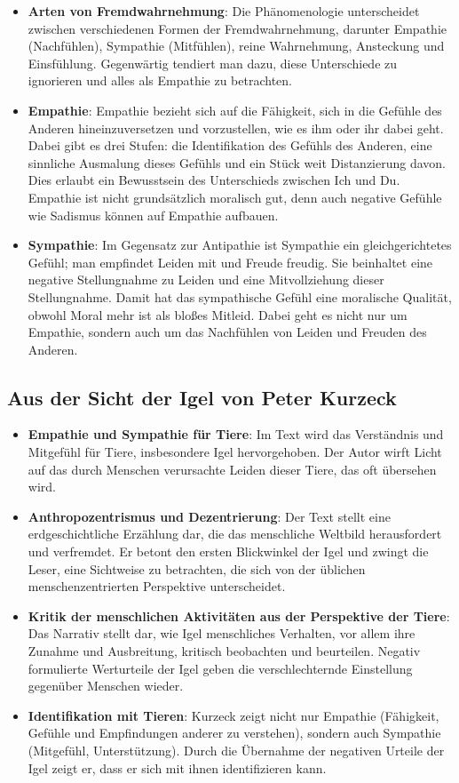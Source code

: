 \documentclass{article}
\begin{document}
\begin{itemize}
	\item \textbf{Arten von Fremdwahrnehmung}: Die Phänomenologie unterscheidet zwischen verschiedenen Formen der Fremdwahrnehmung, darunter Empathie (Nachfühlen), Sympathie (Mitfühlen), reine Wahrnehmung, Ansteckung und Einsfühlung. Gegenwärtig tendiert man dazu, diese Unterschiede zu ignorieren und alles als Empathie zu betrachten.

	\item \textbf{Empathie}: Empathie bezieht sich auf die Fähigkeit, sich in die Gefühle des Anderen hineinzuversetzen und vorzustellen, wie es ihm oder ihr dabei geht. Dabei gibt es drei Stufen: die Identifikation des Gefühls des Anderen, eine sinnliche Ausmalung dieses Gefühls und ein Stück weit Distanzierung davon. Dies erlaubt ein Bewusstsein des Unterschieds zwischen Ich und Du. Empathie ist nicht grundsätzlich moralisch gut, denn auch negative Gefühle wie Sadismus können auf Empathie aufbauen.

	\item \textbf{Sympathie}: Im Gegensatz zur Antipathie ist Sympathie ein gleichgerichtetes Gefühl; man empfindet Leiden mit und Freude freudig. Sie beinhaltet eine negative Stellungnahme zu Leiden und eine Mitvollziehung dieser Stellungnahme. Damit hat das sympathische Gefühl eine moralische Qualität, obwohl Moral mehr ist als bloßes Mitleid. Dabei geht es nicht nur um Empathie, sondern auch um das Nachfühlen von Leiden und Freuden des Anderen.
\end{itemize}

\subsection{Aus der Sicht der Igel von Peter Kurzeck}

\begin{itemize}
	\item \textbf{Empathie und Sympathie für Tiere}: Im Text wird das Verständnis und Mitgefühl für Tiere, insbesondere Igel hervorgehoben. Der Autor wirft Licht auf das durch Menschen verursachte Leiden dieser Tiere, das oft übersehen wird.
	\item \textbf{Anthropozentrismus und Dezentrierung}: Der Text stellt eine erdgeschichtliche Erzählung dar, die das menschliche Weltbild herausfordert und verfremdet. Er betont den ersten Blickwinkel der Igel und zwingt die Leser, eine Sichtweise zu betrachten, die sich von der üblichen menschenzentrierten Perspektive unterscheidet.
	\item \textbf{Kritik der menschlichen Aktivitäten aus der Perspektive der Tiere}: Das Narrativ stellt dar, wie Igel menschliches Verhalten, vor allem ihre Zunahme und Ausbreitung, kritisch beobachten und beurteilen. Negativ formulierte Werturteile der Igel geben die verschlechternde Einstellung gegenüber Menschen wieder.
	\item \textbf{Identifikation mit Tieren}: Kurzeck zeigt nicht nur Empathie (Fähigkeit, Gefühle und Empfindungen anderer zu verstehen), sondern auch Sympathie (Mitgefühl, Unterstützung). Durch die Übernahme der negativen Urteile der Igel zeigt er, dass er sich mit ihnen identifizieren kann.
\end{itemize}
\end{document}
